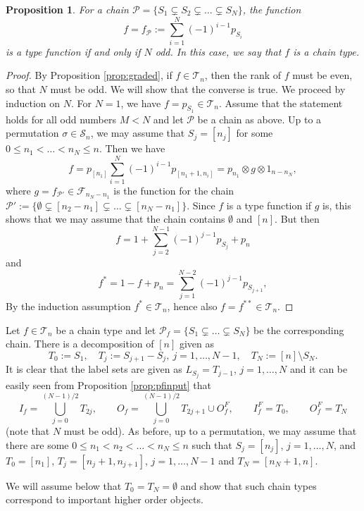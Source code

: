 \documentclass[12pt]{article}
\newtheorem{prop}{Proposition}
\theoremstyle{definition}
\theoremstyle{remark}
\def\Te{\mathcal T}
\def\Fe{\mathcal F}
\def\Pe{\mathcal P}
\def\permut{\mathscr{S}}
\begin{document}
\begin{prop}\label{prop:chains} For a chain   $\Pe=\{S_1\subsetneq S_2\subsetneq \dots \subsetneq
S_N\}$, the function  
\[
f=f_\Pe:=\sum_{i=1}^N (-1)^{i-1} p_{S_i}
\]
is a type function if and only if $N$ odd. In this case, we say that $f$ is a chain type.

\end{prop}

\begin{proof}
By Proposition \ref{prop:graded}, if $f\in \Te_n$, then the rank of $f$ must be even, so
that $N$ must be odd. 
We will show that the converse is true. We proceed by induction on $N$. For $N=1$, we have
$f=p_{S_1}\in \Te_n$. Assume that the statement holds for all odd numbers $M<N$ and let
$\Pe$ be a chain as above. Up to a permutation $\sigma\in \permut_n$, we may assume that
$S_j=[n_j]$ for some $0\le n_1<\dots <n_N\le n$. Then we have 
\[
f=p_{[n_1]}\sum_{i=1}^N (-1)^{i-1}p_{[n_1+1,n_i]}= p_{n_1}\otimes g\otimes 1_{n-n_N},
\]
where  $g=f_{\Pe'}\in
\Fe_{n_N-n_1}$ is the function for the chain $\Pe':=\{\emptyset\subsetneq [n_2-n_1]\subsetneq \dots
\subsetneq [n_N-n_1]\}$. Since $f$ is a type function if $g$ is, this shows that we may assume that 
the chain contains $\emptyset$ and $[n]$.  But then 
\[
f=1+\sum_{j=2}^{N-1} (-1)^{j-1}p_{S_j}+ p_{n} 
\]
and
\[
f^*=1-f+p_{n}=\sum_{j=1}^{N-2} (-1)^{j-1}p_{S_{j+1}},
\]
By the induction assumption $f^*\in \Te_n$, hence also $f=f^{**}\in
\Te_n$.
\end{proof}


Let $f\in \Te_n$ be a chain type and let $\Pe_f=\{S_1\subsetneq \dots \subsetneq
S_N\}$ be the corresponding chain. There is a decomposition of $[n]$ given as
\[
T_0:=S_1,\quad T_j:=S_{j+1}-S_{j},\ j=1,\dots,N-1, \quad T_{N}:=[n]\setminus S_N.
\]
It is clear that the label sets are given as $L_{S_j}=T_{j-1}$, $j=1,\dots, N$ and
it can be easily seen from Proposition \ref{prop:pfinput} that 
\begin{equation}\label{eq:chain_io}
I_f=\bigcup_{j=0}^{(N-1)/2}{T_{2j}}, \qquad O_f=\bigcup_{j=0}^{(N-1)/2}{T_{2j+1}}\cup
O_f^F,\qquad I_f^F=T_0,\qquad O_f^F=T_{N}
\end{equation}
(note that $N$ must be odd).  As before, up to a permutation, we may assume that  there are some $0\le
n_1<n_2<\dots<n_{N}\le n$ such that $S_j=[n_j]$, $j=1,\dots,N$, and $T_0=[n_1]$,
$T_j=[n_{j}+1, n_{j+1}]$, $j=1,\dots, N-1$ and $T_{N}=[n_N+1,n]$. 

We will assume below that
$T_0=T_{N}=\emptyset$ and  show that such chain types  correspond to important higher order objects. 
\end{document}
